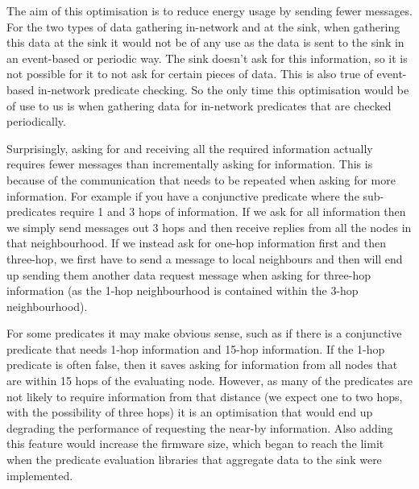 The aim of this optimisation is to reduce energy usage by sending fewer messages. For the two types of data gathering in-network and at the sink, when gathering this data at the sink it would not be of any use as the data is sent to the sink in an event-based or periodic way. The sink doesn't ask for this information, so it is not possible for it to not ask for certain pieces of data. This is also true of event-based in-network predicate checking. So the only time this optimisation would be of use to us is when gathering data for in-network predicates that are checked periodically.

Surprisingly, asking for and receiving all the required information actually requires fewer messages than incrementally asking for information. This is because of the communication that needs to be repeated when asking for more information. For example if you have a conjunctive predicate where the sub-predicates require 1 and 3 hops of information. If we ask for all information then we simply send messages out 3 hops and then receive replies from all the nodes in that neighbourhood. If we instead ask for one-hop information first and then three-hop, we first have to send a message to local neighbours and then will end up sending them another data request message when asking for three-hop information (as the 1-hop neighbourhood is contained within the 3-hop neighbourhood).

For some predicates it may make obvious sense, such as if there is a conjunctive predicate that needs 1-hop information and 15-hop information. If the 1-hop predicate is often false, then it saves asking for information from all nodes that are within 15 hops of the evaluating node. However, as many of the predicates are not likely to require information from that distance (we expect one to two hops, with the possibility of three hops) it is an optimisation that would end up degrading the performance of requesting the near-by information. Also adding this feature would increase the firmware size, which began to reach the limit when the predicate evaluation libraries that aggregate data to the sink were implemented.

